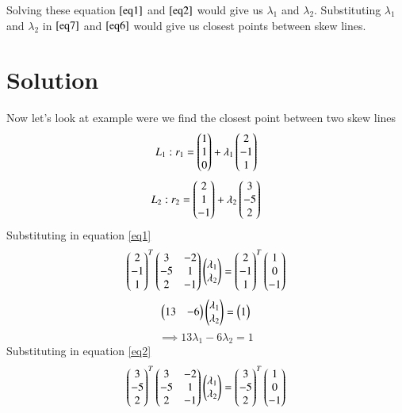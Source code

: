 \documentclass[journal,12pt,twocolumn]{IEEEtran}
\begin{document}
Solving these equation $\eqref{eq1}$ and $\eqref{eq2}$ would give us $\lambda{_1}$ and $\lambda{_2}$. Substituting $\lambda{_1}$ and $\lambda{_2}$ in $\eqref{eq7}$ and $\eqref{eq6}$ would give us closest points between skew lines.

\section{Solution}
Now let's look at example were we find the closest point between two skew lines
\begin{equation}\label{eq4}
    L_1: r_1 = \begin{pmatrix}1\\1\\0\end{pmatrix} + \lambda{_1}\begin{pmatrix}2\\-1\\1\end{pmatrix}
\end{equation}
\begin{equation}\label{eq5}
    L_2: r_2 = \begin{pmatrix}2\\1\\-1\end{pmatrix} + \lambda{_2}\begin{pmatrix}3\\-5\\2\end{pmatrix}
\end{equation}
Substituting in equation \eqref{eq1}
\begin{equation}
    \begin{pmatrix}2\\-1\\1\end{pmatrix}^T\begin{pmatrix}3 & -2\\-5 & 1\\2 & -1\end{pmatrix}\begin{pmatrix}\lambda{_1}\\\lambda{_2}\end{pmatrix} = \begin{pmatrix}2\\-1\\1\end{pmatrix}^T\begin{pmatrix}1\\0\\-1\end{pmatrix}
\end{equation}
\begin{equation}
    \begin{pmatrix}13 & -6\end{pmatrix}\begin{pmatrix}\lambda{_1}\\\lambda{_2}\end{pmatrix} = \begin{pmatrix}1\end{pmatrix}
\end{equation}
\begin{equation}\label{eq3}
    \implies 13\lambda{_1} -6\lambda{_2} = 1
\end{equation}
Substituting in equation \eqref{eq2}
\begin{equation}
    \begin{pmatrix}3\\-5\\2\end{pmatrix}^T\begin{pmatrix}3 & -2\\-5 & 1\\2 & -1\end{pmatrix}\begin{pmatrix}\lambda{_1}\\\lambda{_2}\end{pmatrix} = \begin{pmatrix}3\\-5\\2\end{pmatrix}^T\begin{pmatrix}1\\0\\-1\end{pmatrix}
\end{equation}
\end{document}
